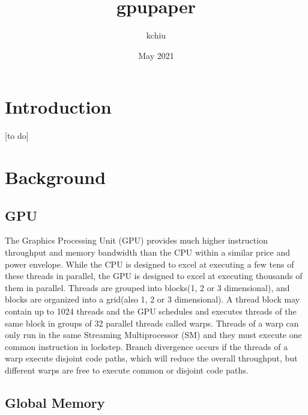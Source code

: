 \documentclass[conference]{IEEEtran}
\title{gpupaper}
\author{kchiu }
\date{May 2021}
\begin{document}
\maketitle
\section{Introduction}
[to do]
\section{Background}
\subsection{GPU}
The Graphics Processing Unit (GPU) provides much higher instruction throughput and memory bandwidth than the CPU within a similar price and power envelope\cite{b1}. While the CPU is designed to excel at executing a few tens of these threads in parallel, the GPU is designed to excel at executing thousands of them in parallel\cite{b1}\cite{b2}. Threads are grouped into blocks(1, 2 or 3 dimensional), and blocks are organized into a grid(also 1, 2 or 3 dimensional). A thread block may contain up to 1024 threads and the GPU schedules and executes threads of the same block in groups of 32 parallel threads called warps\cite{b1}. Threads of a warp can only run in the same Streaming Multiprocessor (SM) and they must execute one common instruction in lockstep. Branch divergence occurs if the threads of a warp execute disjoint code paths, which will reduce the overall throughput, but different warps are free to execute common or disjoint code paths. 


\subsection{Global Memory}
\end{document}

